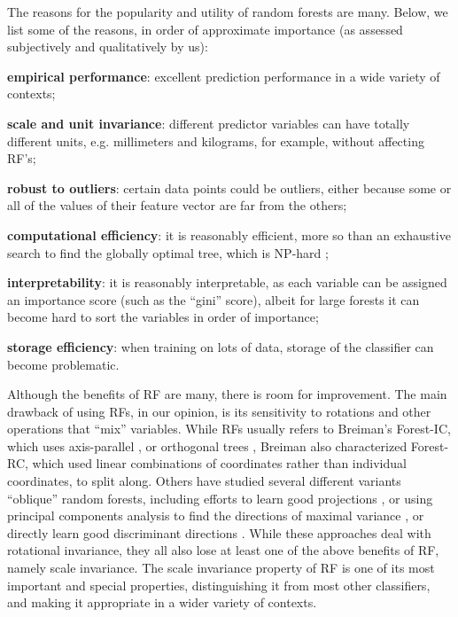 \documentclass{article} %
\begin{document}
The reasons for the popularity and utility of random forests are many. Below, we list some of the reasons, in order of approximate importance (as assessed subjectively and qualitatively by us):
\begin{compactitem}
\item \textbf{empirical performance}: excellent prediction performance in a wide variety of contexts;
\item \textbf{scale and unit invariance}: different predictor variables can have totally different units, e.g. millimeters and kilograms, for example, without affecting RF's;
\item \textbf{robust to outliers}: certain data points could be outliers, either because some or all of the values of their feature vector are far from the others;
\item \textbf{computational efficiency}: it is reasonably efficient, more so than an exhaustive search to find the globally optimal tree, which is NP-hard \cite{Heath1993};
\item \textbf{interpretability}: it is reasonably interpretable, as each variable can be assigned an importance score (such as the ``gini'' score), albeit for large forests it can become hard to sort the variables in order of importance;
\item \textbf{storage efficiency}: when training on lots of data, storage of the classifier can become problematic.
\end{compactitem}


Although the benefits of RF are many, there is room for improvement. The main drawback of using RFs, in our opinion, is its sensitivity to rotations and other operations that ``mix'' variables.  While RFs usually refers to Breiman's Forest-IC, which uses axis-parallel \cite{Heath1993}, or orthogonal trees \cite{Menze2011}, Breiman also characterized Forest-RC, which used linear combinations of coordinates rather than individual coordinates, to split along.  Others have studied several different variants ``oblique'' random forests, including efforts to learn good projections \cite{Heath1993,Tan2004}, or using principal components analysis to find the directions of maximal variance \cite{Ho1998,Rodriguez2006}, or directly learn good discriminant directions \cite{Menze2011}.  While these approaches deal with rotational invariance, they all also lose at least one of the above benefits of RF, namely scale invariance.  The scale invariance property of RF is one of its most important and special properties, distinguishing it from most other classifiers, and making it appropriate in a wider variety of contexts.  
\end{document}
